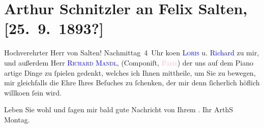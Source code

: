 

\renewcommand{\erwaehntePersonen}{Personen: Richard Beer-Hofmann, Hugo von Hofmannsthal, Richard Mandl, Felix Salten}
\renewcommand{\erwaehnteOrte}{Orte: Paris, Wien}
\renewcommand{\erwaehnteWerke}{Werke: ?? [Romanprojekt]}
\section[Arthur Schnitzler an Felix Salten, {[}25. 9. 1893?{]}]{Arthur Schnitzler an Felix Salten, {[}25. 9. 1893?{]}}
\nopagebreak{}
\rehead{ }\normalsize\beginnumbering{}
\toendnotes[C]{\smallbreak\pagebreak[2]}
\toendnotes[C]{\smallbreak}
\pstart{}{\pb}Hochverehrter Herr von Salten!\pend
\pstart
           \label{K_L02962-1v}\label{K_L02962-1h}{ }Nachmittag 4 Uhr ko{\geminationm}en \textsc{\textcolor{blue}{Loris}{}\ledrightnote{\textcolor{blue}{Hugo von Hofmannsthal}}} u. \textcolor{blue}{Richard}{}\ledrightnote{\textcolor{blue}{Richard Beer-Hofmann}} zu mir, und außerdem Herr \textsc{\textcolor{blue}{Richard Mandl}{}\ledrightnote{\textcolor{blue}{Richard Mandl}}}, (Componiſt, \textcolor{pink}{Paris}{}\ledrightnote{\textcolor{pink}{Paris}}) {\pb}der uns auf dem Piano artige Dinge zu ſpielen
               gedenkt, welches ich Ihnen mittheile, um Sie zu bewegen, mir gleichfalls die Ehre
               Ihres Beſuches zu ſchenken, der mir denn {\pb}ſicherlich höflich willko\textcolor{gray}{{\geminationm}}en ſein wird.\pend
           
\pstart
           Leben Sie wohl und ſagen mir bald gute Nachricht von Ihrem \label{K_L02962-2v}\label{K_L02962-2h}.\pend
           \pstart Ihr \spacefill\mbox{ArthS}\pend{}
\pstart
           Montag.\pend
           \endnumbering{}  
      